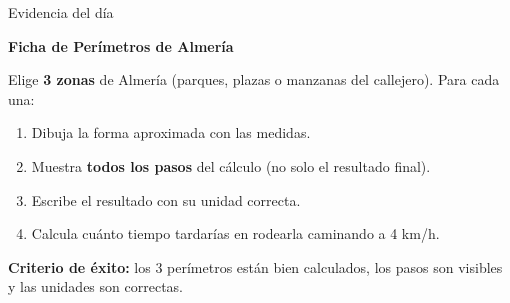 \documentclass[aspectratio=169, 10pt, spanish]{beamer}
\begin{document}
\begin{frame}{Evidencia del día}
  \begin{evidenciabox}
    \textbf{Ficha de Perímetros de Almería}

    \vspace{0.2cm}
    Elige \textbf{3 zonas} de Almería (parques, plazas o manzanas
    del callejero). Para cada una:
    \begin{enumerate}
      \item Dibuja la forma aproximada con las medidas.
      \item Muestra \textbf{todos los pasos} del cálculo
            (no solo el resultado final).
      \item Escribe el resultado con su unidad correcta.
      \item Calcula cuánto tiempo tardarías en rodearla
            caminando a 4 km/h.
    \end{enumerate}
    \vspace{0.2cm}
    \textbf{Criterio de éxito:} los 3 perímetros están bien calculados,
    los pasos son visibles y las unidades son correctas.
  \end{evidenciabox}
\end{frame}
\end{document}
